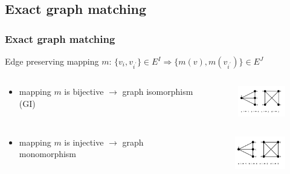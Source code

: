 \documentclass[hyperref={pdfpagelabels=false}]{beamer}
\begin{document}
\subsection{Exact graph matching}
\begin{frame}[allowframebreaks]
\frametitle{Exact graph matching}
Edge preserving mapping $m$:
$\{v_i,v_{i^\prime}\}\in E^I\Rightarrow\{m(v),m(v_{i^\prime})\}\in E^J$ %

\begin{minipage}[0.2\textheight]{\textwidth}
	\begin{columns}[T]
		\begin{column}{0.6\textwidth}
			\begin{itemize}
			\item mapping $m$ is bijective $\rightarrow$ graph isomorphism (GI)
			\end{itemize}
		\end{column}
		\begin{column}{0.3\textwidth}
			\begin{figure}[h!]
			    \centering
			    \includegraphics[width=2.3cm]{fig/GI}
			\end{figure}
		\end{column}
	\end{columns}
\end{minipage}

\begin{minipage}[0.2\textheight]{\textwidth}
	\begin{columns}[T]
		\begin{column}{0.6\textwidth}
			\begin{itemize}
			\item mapping $m$ is injective $\rightarrow$ graph monomorphism
			\end{itemize}
		\end{column}
		\begin{column}{0.3\textwidth}
			\begin{figure}[h!]
			    \centering
			    \includegraphics[width=2.3cm]{fig/monomorphism}
			\end{figure}
		\end{column}
	\end{columns}
\end{minipage}


\end{frame}
\end{document}
